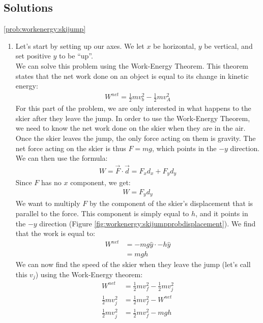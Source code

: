 \newpage
\subsection{Solutions}
\begin{solution}{\ref{prob:workenergy:skijump}}
\begin{enumerate}[label=\alph*)]
\item Let's start by setting up our axes. We let $x$ be horizontal, $y$ be vertical, and set positive $y$ to be ``up''. \\

We can solve this problem using the Work-Energy Theorem. This theorem states that the net work done on an object is equal to its change in kinetic energy:
\begin{align*}
W^{net}=\frac{1}{2}mv_b^2-\frac{1}{2}mv_A^2
\end{align*}
For this part of the problem, we are only interested in what happens to the skier after they leave the jump. In order to use the Work-Energy Theorem, we need to know the net work done on the skier when they are in the air. Once the skier leaves the jump, the only force acting on them is gravity. The net force acting on the skier is thus $F=mg$, which points in the $-y$ direction. We can then use the formula: 
\begin{align*}
W=\vec F \cdot \vec d = F_xd_x+F_yd_y
\end{align*}
Since $F$ has no $x$ component, we get:
\begin{align*}
W=F_yd_y
\end{align*}
We want to multiply $F$ by the component of the skier's displacement that is parallel to the force. This component is simply equal to $h$, and it points in the $-y$ direction (Figure \ref{fig:workenergy:skijumpprobdisplacement}).
 We find that the work is equal to:
\begin{align*}
W^{net}&=-mg\hat y \cdot -h\hat y\\
&=mgh
\end{align*}
We can now find the speed of the skier when they leave the jump (let's call this $v_j$) using the Work-Energy theorem:
\begin{align*}
W^{net}&=\frac{1}{2}mv_f^2-\frac{1}{2}mv_j^2\\
\frac{1}{2}mv_j^2&=\frac{1}{2}mv_f^2-W^{net}\\
\frac{1}{2}mv_j^2&=\frac{1}{2}mv_f^2-mgh\\

\end{align*}
\end{enumerate}
\end{solution}
